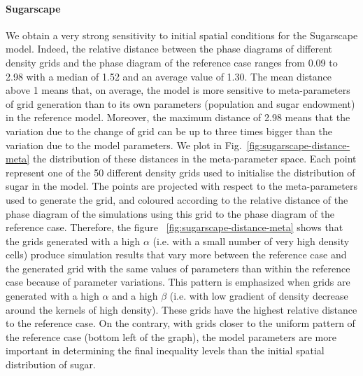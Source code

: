 \documentclass[preprint,5p,times,twocolumn,authoryear]{elsarticle}
\begin{document}
\paragraph{Sugarscape} 



We obtain a very strong sensitivity to initial spatial conditions for the Sugarscape model. Indeed, the relative distance between the phase diagrams of different density grids and the phase diagram of the reference case ranges from 0.09 to 2.98 with a median of 1.52 and an average value of 1.30. The mean distance above 1 means that, on average, the model is more sensitive to meta-parameters of grid generation than to its own parameters (population and sugar endowment) in the reference model. Moreover, the maximum distance of 2.98 means that the variation due to the change of grid can be up to three times bigger than the variation due to the model parameters. We plot in Fig.~\ref{fig:sugarscape-distance-meta} the distribution of these distances in the meta-parameter space. Each point represent one of the 50 different density grids used to initialise the distribution of sugar in the model. The points are projected with respect to the meta-parameters used to generate the grid, and coloured according to the relative distance of the phase diagram of the simulations using this grid to the phase diagram of the reference case. Therefore, the figure ~\ref{fig:sugarscape-distance-meta} shows that the grids generated with a high $\alpha$ (i.e. with a small number of very high density cells) produce simulation results that vary more between the reference case and the generated grid with the same values of parameters than within the reference case because of parameter variations. This pattern is emphasized when grids are generated with a high $\alpha$ and a high $\beta$ (i.e. with low gradient of density decrease around the kernels of high density). These grids have the highest relative distance to the reference case. On the contrary, with grids closer to the uniform pattern of the reference case (bottom left of the graph), the model parameters are more important in determining the final inequality levels than the initial spatial distribution of sugar. 
\end{document}
